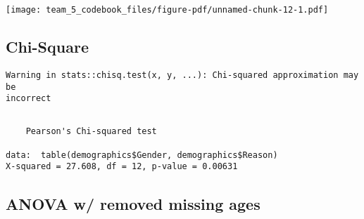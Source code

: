\documentclass[
  letterpaper,
  DIV=11,
  numbers=noendperiod]{scrartcl}
\newenvironment{Shaded}{\begin{snugshade}}{\end{snugshade}}
\newcommand{\CommentTok}[1]{\textcolor[rgb]{0.37,0.37,0.37}{#1}}
\newcommand{\ConstantTok}[1]{\textcolor[rgb]{0.56,0.35,0.01}{#1}}
\newcommand{\FunctionTok}[1]{\textcolor[rgb]{0.28,0.35,0.67}{#1}}
\newcommand{\NormalTok}[1]{\textcolor[rgb]{0.00,0.23,0.31}{#1}}
\newcommand{\OtherTok}[1]{\textcolor[rgb]{0.00,0.23,0.31}{#1}}
\newcommand{\SpecialCharTok}[1]{\textcolor[rgb]{0.37,0.37,0.37}{#1}}
\newcommand{\StringTok}[1]{\textcolor[rgb]{0.13,0.47,0.30}{#1}}
\begin{document}
\begin{center}
\texttt{[image: team\_5\_codebook\_files/figure-pdf/unnamed-chunk-12-1.pdf]}
\end{center}

\subsection{Chi-Square}\label{chi-square}

\begin{Shaded}
\end{Shaded}

\begin{verbatim}
Warning in stats::chisq.test(x, y, ...): Chi-squared approximation may be
incorrect
\end{verbatim}

\begin{verbatim}

    Pearson's Chi-squared test

data:  table(demographics$Gender, demographics$Reason)
X-squared = 27.608, df = 12, p-value = 0.00631
\end{verbatim}

\subsection{ANOVA w/ removed missing
ages}\label{anova-w-removed-missing-ages}

\begin{Shaded}
\end{Shaded}
\end{document}

